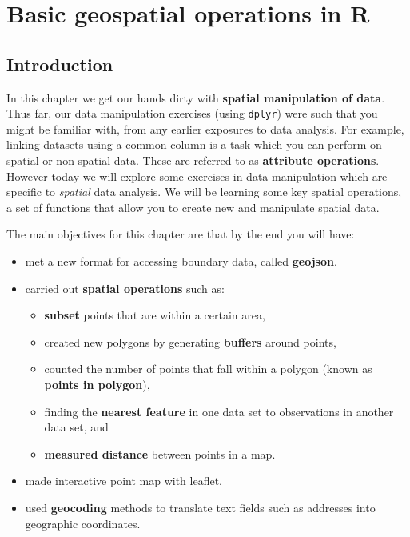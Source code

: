 \documentclass[
]{book}
\providecommand{\tightlist}{%
  \setlength{\itemsep}{0pt}\setlength{\parskip}{0pt}}
\begin{document}
\hypertarget{basic-geospatial-operations-in-r}{%
\chapter{Basic geospatial operations in R}\label{basic-geospatial-operations-in-r}}

\hypertarget{introduction-1}{%
\section{Introduction}\label{introduction-1}}

In this chapter we get our hands dirty with \textbf{spatial manipulation of data}. Thus far, our data manipulation exercises (using \texttt{dplyr}) were such that you might be familiar with, from any earlier exposures to data analysis. For example, linking datasets using a common column is a task which you can perform on spatial or non-spatial data. These are referred to as \textbf{attribute operations}. However today we will explore some exercises in data manipulation which are specific to \emph{spatial} data analysis. We will be learning some key spatial operations, a set of functions that allow you to create new and manipulate spatial data.

The main objectives for this chapter are that by the end you will have:

\begin{itemize}
\tightlist
\item
  met a new format for accessing boundary data, called \textbf{geojson}.
\item
  carried out \textbf{spatial operations} such as:

  \begin{itemize}
  \tightlist
  \item
    \textbf{subset} points that are within a certain area,
  \item
    created new polygons by generating \textbf{buffers} around points,
  \item
    counted the number of points that fall within a polygon (known as \textbf{points in polygon}),
  \item
    finding the \textbf{nearest feature} in one data set to observations in another data set, and
  \item
    \textbf{measured distance} between points in a map.
  \end{itemize}
\item
  made interactive point map with leaflet.
\item
  used \textbf{geocoding} methods to translate text fields such as addresses into geographic coordinates.
\end{itemize}
\end{document}
